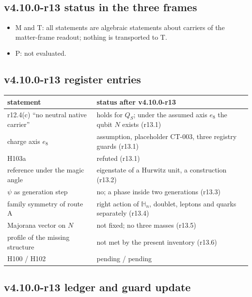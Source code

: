 \subsection*{v4.10.0-r13 status in the three frames}
\label{subsec:v4100-r13-frames}

\begin{itemize}[leftmargin=2em]
\item M and T: all statements are algebraic statements about carriers of the matter-frame readout; nothing is
transported to T.
\item P: not evaluated.
\end{itemize}

\subsection*{v4.10.0-r13 register entries}
\label{subsec:v4100-r13-register}

\begin{center}
\small
\begin{tabular}{@{}>{\raggedright\arraybackslash}p{}>{\raggedright\arraybackslash}p{}@{}}
\toprule
statement & status after v4.10.0-r13\\
\midrule
r12.4(c) ``no neutral native carrier'' & holds for \(Q_S\); under the assumed axis \(e_8\) the qubit \(N\) exists (r13.1)\\
charge axis \(e_8\) & assumption, placeholder CT-003, three registry guards (r13.1)\\
H103a & refuted (r13.1)\\
reference under the magic angle & eigenstate of a Hurwitz unit, a construction (r13.2)\\
\(\psi\) as generation step & no; a phase inside two generations (r13.3)\\
family symmetry of route A & right action of \(\mathbb H_n\), doublet, leptons and quarks separately (r13.4)\\
Majorana vector on \(N\) & not fixed; no three masses (r13.5)\\
profile of the missing structure & not met by the present inventory (r13.6)\\
H100 / H102 & pending / pending\\
\bottomrule
\end{tabular}
\end{center}

\subsection*{v4.10.0-r13 ledger and guard update}
\label{subsec:v4100-r13-ledger-guard}

